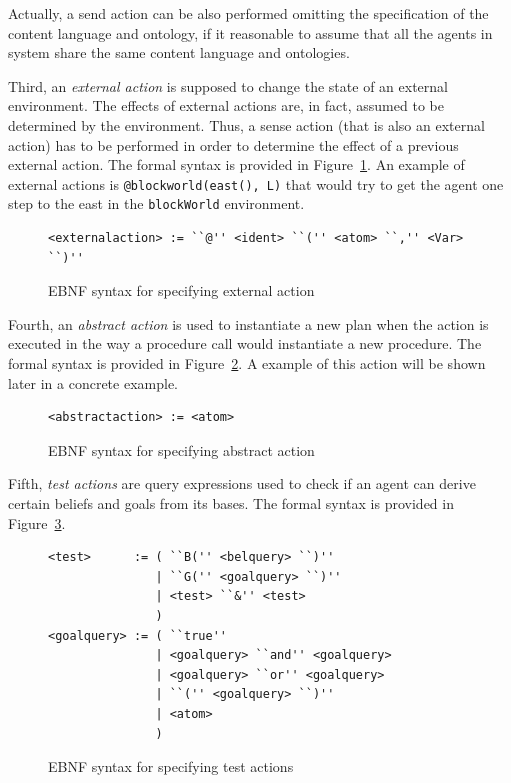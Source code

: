 \documentclass[a4paper]{article}
\begin{document}
Actually, a send action can be also performed omitting the specification of the content language and ontology, if it reasonable to assume that all the agents in system share the same content language and ontologies.

Third, an \emph{external action} is supposed to change the state of an external environment. The effects of external actions are, in fact, assumed to be determined by the environment. Thus, a sense action (that is also an external action) has to be performed in order to determine the effect of a previous external action. The formal syntax is provided in Figure~\ref{fig:ebnf_extaction}. An example of external actions is \texttt{@blockworld(east(), L)} that would try to get the agent one step to the east in the \texttt{blockWorld} environment.

\begin{figure}[htp]
\begin{verbatim}
<externalaction> := ``@'' <ident> ``('' <atom> ``,'' <Var> ``)''
\end{verbatim}
\caption{EBNF syntax for specifying external action}
\label{fig:ebnf_extaction}
\end{figure}

Fourth, an \emph{abstract action} is used to instantiate a new plan when the action is executed in the way a procedure call would instantiate a new procedure. The formal syntax is provided in Figure~\ref{fig:ebnf_absaction}. A example of this action will be shown later in a concrete example.

\begin{figure}[htp]
\begin{verbatim}
<abstractaction> := <atom>
\end{verbatim}
\caption{EBNF syntax for specifying abstract action}
\label{fig:ebnf_absaction}
\end{figure}

Fifth, \emph{test actions} are query expressions used to check if an agent can derive certain beliefs and goals from its bases. The formal syntax is provided in Figure~\ref{fig:ebnf_testaction}.

\begin{figure}[htp]
\begin{verbatim}
<test>      := ( ``B('' <belquery> ``)'' 
               | ``G('' <goalquery> ``)''
               | <test> ``&'' <test>
               )
<goalquery> := ( ``true'' 
               | <goalquery> ``and'' <goalquery>
               | <goalquery> ``or'' <goalquery>
               | ``('' <goalquery> ``)''
               | <atom>
               )
\end{verbatim}
\caption{EBNF syntax for specifying test actions}
\label{fig:ebnf_testaction}
\end{figure}
\end{document}
